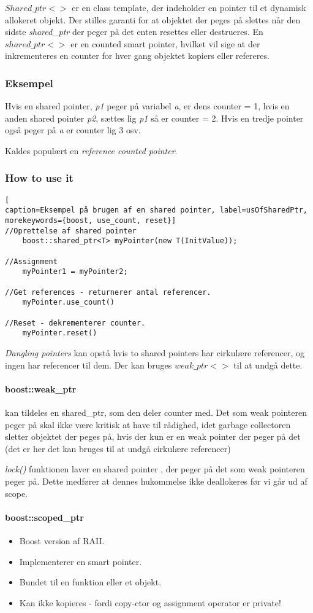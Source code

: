 $Shared\_ptr<>$ er en class template, der indeholder en pointer til et dynamisk allokeret objekt. Der stilles garanti for at objektet der peges på slettes når den sidste \textit{shared\_ptr} der peger på det enten resettes eller destrueres. En $shared\_ptr<>$ er en counted smart pointer, hvilket vil sige at der inkrementeres en counter for hver gang objektet kopiers eller refereres.

\subsubsection{Eksempel}
Hvis en shared pointer, \textit{p1} peger på variabel \textit{a}, er dens counter = 1, hvis en anden shared pointer \textit{p2}, sættes lig \textit{p1} så er counter = 2. Hvis en tredje pointer også peger på \textit{a} er counter lig 3 osv.

Kaldes populært en \textit{reference counted pointer}.

\subsubsection{How to use it}
\begin{lstlisting}[
caption=Eksempel på brugen af en shared pointer, label=usOfSharedPtr,
morekeywords={boost, use_count, reset}]
//Oprettelse af shared pointer
	boost::shared_ptr<T> myPointer(new T(InitValue));

//Assignment
	myPointer1 = myPointer2;
	
//Get references - returnerer antal referencer.
	myPointer.use_count()

//Reset - dekrementerer counter.
	myPointer.reset()
\end{lstlisting}

\textit{Dangling pointers} kan opstå hvis to shared pointers har cirkulære referencer, og ingen har referencer til dem. Der kan bruges $weak\_ptr<>$ til at undgå dette.\\

\paragraph{boost::weak\_ptr}
kan tildeles en shared\_ptr, som den deler counter med.
Det som weak pointeren peger på skal ikke være kritisk at have til rådighed, idet garbage collectoren sletter objektet der peges på, hvis der kun er en weak pointer der peger på det (det er her det kan bruges til at undgå cirkulære referencer)

\textit{lock()} funktionen laver en shared pointer , der peger på det som weak pointeren peger på. Dette medfører at dennes hukommelse ikke deallokeres før vi går ud af scope.

\paragraph{boost::scoped\_ptr}
\begin{itemize}
	\item Boost version af RAII.
	\item Implementerer en smart pointer.
	\item Bundet til en funktion eller et objekt.
	\item Kan ikke kopieres - fordi copy-ctor og assignment operator er private!
\end{itemize}
